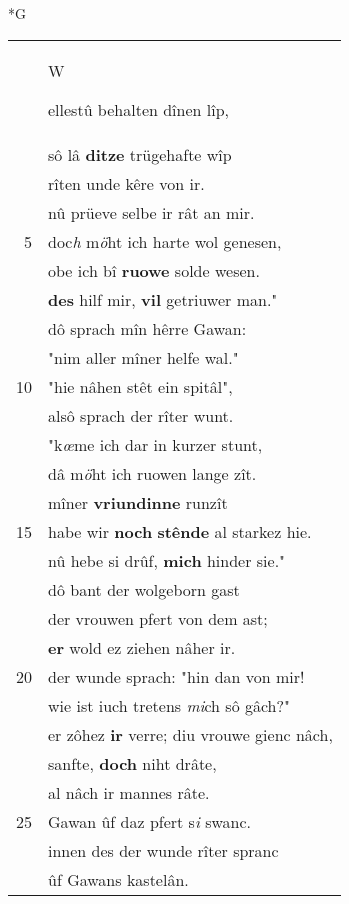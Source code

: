 \documentclass[8pt,a4paper,notitlepage]{article}
\begin{document}
\begin{table}[ht]
\begin{minipage}[t]{0.5\linewidth}
\small
\begin{center}*G
\end{center}
\begin{tabular}{rl}
 & \begin{large}W\end{large}ellestû behalten dînen lîp,\\ 
 & sô lâ \textbf{ditze} trügehafte wîp\\ 
 & rîten unde kêre von ir.\\ 
 & nû prüeve selbe ir rât an mir.\\ 
5 & doc\textit{h} m\textit{ö}ht ich harte wol genesen,\\ 
 & obe ich bî \textbf{ruowe} solde wesen.\\ 
 & \textbf{des} hilf mir, \textbf{vil} getriuwer man."\\ 
 & dô sprach mîn hêrre Gawan:\\ 
 & "nim aller mîner helfe wal."\\ 
10 & "hie nâhen stêt ein spitâl",\\ 
 & alsô sprach der rîter wunt.\\ 
 & "k\textit{œ}me ich dar in kurzer stunt,\\ 
 & dâ m\textit{ö}ht ich ruowen lange zît.\\ 
 & mîner \textbf{vriundinne} runzît\\ 
15 & habe wir \textbf{noch} \textbf{stênde} al starkez hie.\\ 
 & nû hebe si drûf, \textbf{mich} hinder sie."\\ 
 & dô bant der wolgeborn gast\\ 
 & der vrouwen pfert von dem ast;\\ 
 & \textbf{er} wold ez ziehen nâher ir.\\ 
20 & der wunde sprach: "hin dan von mir!\\ 
 & wie ist iuch tretens \textit{mi}ch sô gâch?"\\ 
 & er zôhez \textbf{ir} verre; diu vrouwe gienc nâch,\\ 
 & sanfte, \textbf{doch} niht drâte,\\ 
 & al nâch ir mannes râte.\\ 
25 & Gawan ûf daz pfert s\textit{i} swanc.\\ 
 & innen des der wunde rîter spranc\\ 
 & ûf Gawans kastelân.\\ 

\end{tabular}
\end{minipage}
\end{table}
\end{document}
